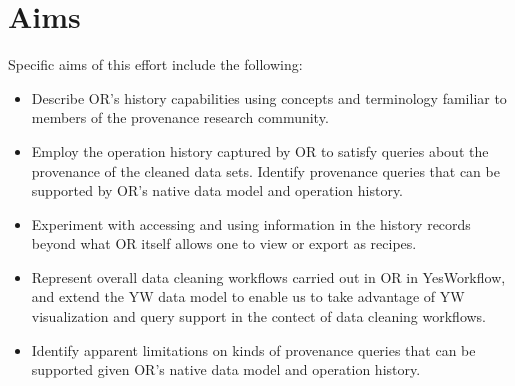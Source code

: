 \section{Aims}

Specific aims of this effort include the following:

\begin{itemize}[label=\raisebox{0.25ex}{\tiny$\bullet$}]

\item Describe OR's history capabilities using concepts and terminology familiar to members of the provenance research community.

\item Employ the operation history captured by OR to satisfy queries about the provenance of the cleaned data sets.
Identify provenance queries that can be supported by OR's native data model and operation history. 

\item Experiment with accessing and using information in the history records beyond what OR itself allows one to view or export as recipes.

\item Represent overall data cleaning workflows carried out in OR in YesWorkflow, and extend the YW data model to enable us to take advantage of YW visualization and query support in the contect of data cleaning workflows.

\item Identify apparent limitations on kinds of provenance queries that can be supported given OR's native data model and operation history. 

\end{itemize}
